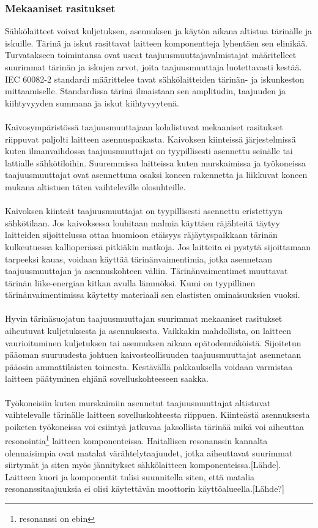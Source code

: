 \documentclass[finnish,12pt,a4paper,pdftex,elec,utf8]{aaltothesis}
\begin{document}
\subsubsection{Mekaaniset rasitukset}
Sähkölaitteet voivat kuljetuksen, asennuksen ja käytön aikana altistua tärinälle ja iskuille. Tärinä ja iskut rasittavat laitteen komponentteja lyhentäen sen elinikää. Turvatakseen toimintansa ovat useat taajuusmuuttajavalmistajat määritelleet suurimmat tärinän ja iskujen arvot, joita taajuusmuuttaja luotettavasti kestää. IEC 60082-2 standardi määrittelee tavat sähkölaitteiden tärinän- ja iskunkeston mittaamiselle. Standardissa tärinä ilmaistaan sen amplitudin, taajuuden ja kiihtyvyyden summana ja iskut kiihtyvyytenä.\cite{IEC60082-2}
\\\\
Kaivosympäristössä taajuusmuuttajaan kohdistuvat mekaaniset rasitukset riippuvat paljolti laitteen asennuspaikasta. Kaivoksen kiinteissä järjestelmissä kuten ilmanvaihdossa taajuusmuuttajat on tyypillisesti asennettu seinälle tai lattialle sähkötiloihin. Suuremmissa laitteissa kuten murskaimissa ja työkoneissa taajuusmuuttajat ovat asennettuna osaksi koneen rakennetta ja liikkuvat koneen mukana altistuen täten vaihteleville olosuhteille.
\\\\
Kaivoksen kiinteät taajuusmuuttajat on tyypillisesti asennettu eristettyyn sähkötilaan. Jos kaivoksessa louhitaan malmia käyttäen räjähteitä täytyy laitteiden sijoittelussa ottaa huomioon etäisyys räjäytyspaikkaan tärinän kulkeutuessa kallioperässä pitkiäkin matkoja. Jos laitteita ei pystytä sijoittamaan tarpeeksi kauas, voidaan käyttää tärinänvaimentimia, jotka asennetaan taajuusmuuttajan ja asennuskohteen väliin. Tärinänvaimentimet muuttavat tärinän liike-energian kitkan avulla lämmöksi. Kumi on tyypillinen tärinänvaimentimissa käytetty materiaali sen elastisten ominaisuuksien vuoksi.
\\\\
Hyvin tärinäsuojatun taajuusmuuttajan suurimmat mekaaniset rasitukset aiheutuvat kuljetuksesta ja asennuksesta. Vaikkakin mahdollista, on laitteen vaurioituminen kuljetuksen tai asennuksen aikana epätodennäköistä. Sijoitetun pääoman suuruudesta johtuen kaivosteollisuuden taajuusmuuttajat asennetaan pääosin ammattilaisten toimesta. Kestävällä pakkauksella voidaan varmistaa laitteen päätyminen ehjänä sovelluskohteeseen saakka.
\\\\ 
Työkoneisiin kuten murskaimiin asennetut taajuusmuuttajat altistuvat vaihtelevalle tärinälle laitteen sovelluskohteesta riippuen. Kiinteästä asennuksesta poiketen työkoneissa voi esiintyä jatkuvaa jaksollista tärinää mikä voi aiheuttaa resonointia\footnote{resonanssi on ebin} laitteen komponenteissa. Haitallisen resonanssin kannalta olennaisimpia ovat matalat värähtelytaajuudet, jotka aiheuttavat suurimmat siirtymät ja siten myös jännitykset sähkölaitteen komponenteissa.[Lähde]. Laitteen kuori ja komponentit tulisi suunnitella siten, että matalia resonanssitaajuuksia ei olisi käytettävän moottorin käyttöalueella.[Lähde?]
\end{document}
